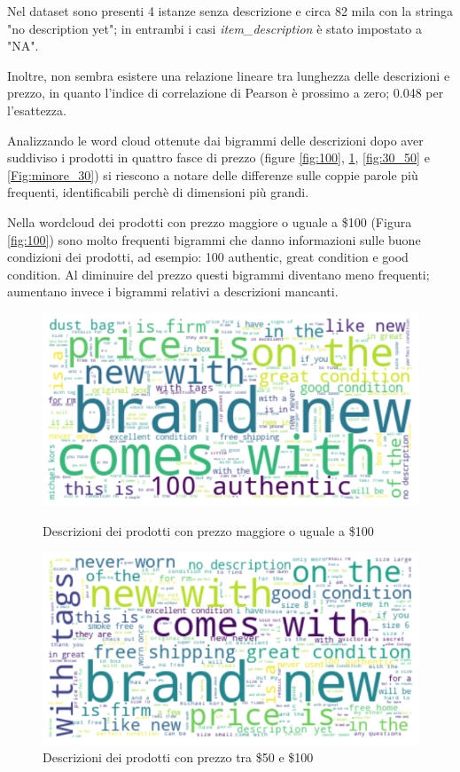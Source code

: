 Nel dataset sono presenti 4 istanze senza descrizione e
circa 82 mila con la stringa "no description yet"; in entrambi i casi
\textit{item\_description} è stato impostato a "NA".

Inoltre, non sembra esistere una relazione lineare tra lunghezza delle
descrizioni e prezzo, in quanto l'indice di correlazione di Pearson è prossimo a
zero; 0.048 per l'esattezza.

Analizzando le word cloud ottenute dai bigrammi delle descrizioni dopo aver
suddiviso i prodotti in quattro fasce di prezzo (figure \ref{fig:100},
\ref{Fig:50_100}, \ref{fig:30_50} e \ref{Fig:minore_30}) si riescono a notare
delle differenze sulle coppie parole più frequenti, identificabili perchè di
dimensioni più grandi.

Nella wordcloud dei prodotti con prezzo maggiore o uguale a \$100 (Figura
\ref{fig:100}) sono molto frequenti bigrammi che danno informazioni sulle buone
condizioni dei prodotti, ad esempio: 100 authentic, great condition e good
condition. Al diminuire del prezzo questi bigrammi diventano meno frequenti;
aumentano invece i bigrammi relativi a descrizioni mancanti.

\begin{figure}[H]
   \begin{minipage}{0.48\textwidth}
     \centering
     \includegraphics[width=.9\linewidth]{maggiore_100}
	\caption{Descrizioni dei prodotti con prezzo maggiore o uguale a \$100}
	\label{fig:100}   
	\end{minipage}\hfill
   \begin{minipage}{0.48\textwidth}
     \centering
     \includegraphics[width=.9\linewidth]{50_100}
     \caption{Descrizioni dei prodotti con prezzo tra \$50 e \$100}
     \label{Fig:50_100}
   \end{minipage}
\end{figure}


